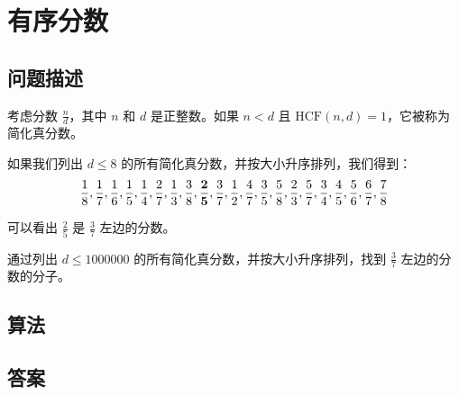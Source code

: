 \section{有序分数}
\subsection{问题描述}
\begin{tcolorbox}
考虑分数 \( \frac{n}{d} \)，其中 \( n \) 和 \( d \) 是正整数。如果 \( n < d \) 且 \( \text{HCF}(n, d) = 1 \)，它被称为简化真分数。

如果我们列出 \( d \leq 8 \) 的所有简化真分数，并按大小升序排列，我们得到：
\[ \frac{1}{8}, \frac{1}{7}, \frac{1}{6}, \frac{1}{5}, \frac{1}{4}, \frac{2}{7}, \frac{1}{3}, \frac{3}{8}, \frac{\bf
2}{\bf 5}, \frac{3}{7}, \frac{1}{2}, \frac{4}{7}, \frac{3}{5}, \frac{5}{8}, \frac{2}{3}, \frac{5}{7}, \frac{3}{4}, \frac{4}{5}, \frac{5}{6}, \frac{6}{7}, \frac{7}{8} \]

可以看出 \( \frac{2}{5} \) 是 \( \frac{3}{7} \) 左边的分数。

通过列出 \( d \leq 1000000 \) 的所有简化真分数，并按大小升序排列，找到 \( \frac{3}{7} \) 左边的分数的分子。

\end{tcolorbox}

\subsection{算法}


\subsection{答案}
